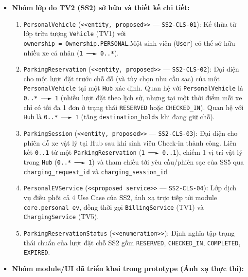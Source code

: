 \documentclass[11pt,a4paper]{article}
\providecommand{\tightlist}{%
  \setlength{\itemsep}{0pt}\setlength{\parskip}{0pt}}
\begin{document}
\begin{itemize}
\tightlist
\item
  \textbf{Nhóm lớp do TV2 (SS2) sở hữu và thiết kế chi tiết:}

  \begin{enumerate}
  \def\labelenumi{\arabic{enumi}.}
  \tightlist
  \item
    \texttt{PersonalVehicle}
    (\texttt{\textless{}\textless{}entity,\ proposed\textgreater{}\textgreater{}}
    --- \texttt{SS2-CLS-01}): Kế thừa từ lớp trừu tượng \texttt{Vehicle}
    (TV1) với \texttt{ownership\ =\ Ownership.PERSONAL}.Một sinh viên
    (\texttt{User}) có thể sở hữu nhiều xe cá nhân
    (\texttt{1\ ──►\ 0..*}).
  \item
    \texttt{ParkingReservation}
    (\texttt{\textless{}\textless{}entity,\ proposed\textgreater{}\textgreater{}}
    --- \texttt{SS2-CLS-02}): Đại diện cho một lượt đặt trước chỗ đỗ (và
    tùy chọn nhu cầu sạc) của một \texttt{PersonalVehicle} tại một
    \texttt{Hub} xác định. Quan hệ với \texttt{PersonalVehicle} là
    \texttt{0..*\ ──►\ 1} (nhiều lượt đặt theo lịch sử, nhưng tại một
    thời điểm mỗi xe chỉ có tối đa 1 đơn ở trạng thái \texttt{RESERVED}
    hoặc \texttt{CHECKED\_IN}). Quan hệ với \texttt{Hub} là
    \texttt{0..*\ ──►\ 1} (tăng \texttt{destination\_holds} khi đang giữ
    chỗ).
  \item
    \texttt{ParkingSession}
    (\texttt{\textless{}\textless{}entity,\ proposed\textgreater{}\textgreater{}}
    --- \texttt{SS2-CLS-03}): Đại diện cho phiên đỗ xe vật lý tại Hub
    sau khi sinh viên Check-in thành công. Liên kết \texttt{0..1} từ một
    \texttt{ParkingReservation} (\texttt{1\ ──►\ 0..1}), chiếm 1 vị trí
    vật lý trong \texttt{Hub} (\texttt{0..*\ ──►\ 1}) và tham chiếu tới
    yêu cầu/phiên sạc của SS5 qua \texttt{charging\_request\_id} và
    \texttt{charging\_session\_id}.
  \item
    \texttt{PersonalEVService}
    (\texttt{\textless{}\textless{}proposed\ service\textgreater{}\textgreater{}}
    --- \texttt{SS2-CLS-04}): Lớp dịch vụ điều phối cả 4 Use Case của
    SS2, ánh xạ trực tiếp tới module \texttt{core.personal\_ev}, đồng
    thời gọi \texttt{BillingService} (TV1) và \texttt{ChargingService}
    (TV5).
  \item
    \texttt{ParkingReservationStatus}
    (\texttt{\textless{}\textless{}enumeration\textgreater{}\textgreater{}}):
    Định nghĩa tập trạng thái chuẩn của lượt đặt chỗ SS2 gồm
    \texttt{RESERVED}, \texttt{CHECKED\_IN}, \texttt{COMPLETED},
    \texttt{EXPIRED}.
  \end{enumerate}
\item
  \textbf{Nhóm module/UI đã triển khai trong prototype (Ánh xạ thực
  thi):}


\end{itemize}
\end{document}
